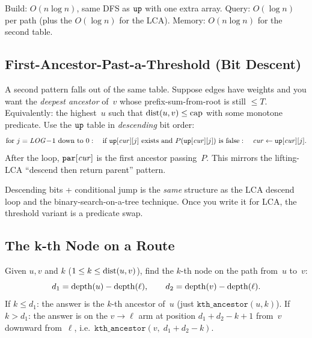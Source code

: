 \begin{complexitybox}
Build: \(O(n\log n)\), same DFS as \(\texttt{up}\) with one extra array.
Query: \(O(\log n)\) per path (plus the \(O(\log n)\) for the LCA).
Memory: \(O(n\log n)\) for the second table.
\end{complexitybox}

\subsection{First-Ancestor-Past-a-Threshold (Bit Descent)}

A second pattern falls out of the same table.  Suppose edges have
weights and you want the \emph{deepest ancestor} of~\(v\) whose
prefix-sum-from-root is still \(\le T\).  Equivalently: the highest~\(u\)
such that \(\operatorname{dist}(u, v) \le \text{cap}\) with some monotone predicate.
Use the \(\texttt{up}\) table in \emph{descending} bit order:
\[
\text{for } j = \mathit{LOG}\!-\!1 \text{ down to } 0:\quad
\text{if } \texttt{up}[\mathit{cur}][j] \text{ exists and } P(\texttt{up}[\mathit{cur}][j]) \text{ is false}:
\quad \mathit{cur} \leftarrow \texttt{up}[\mathit{cur}][j].
\]
After the loop, \(\texttt{par}[\mathit{cur}]\) is the first ancestor passing~\(P\).
This mirrors the lifting-LCA ``descend then return parent'' pattern.

\begin{insightbox}
Descending bits + conditional jump is the \emph{same} structure as
the LCA descend loop and the binary-search-on-a-tree technique.  Once you
write it for LCA, the threshold variant is a predicate swap.
\end{insightbox}

\subsection{The k-th Node on a Route}

Given \(u, v\) and \(k\) (\(1 \le k \le \operatorname{dist}(u,v)\)), find the
\(k\)-th node on the path from~\(u\) to~\(v\):
\[
  d_1 = \operatorname{depth}(u) - \operatorname{depth}(\ell), \qquad d_2 = \operatorname{depth}(v) - \operatorname{depth}(\ell).
\]
If \(k \le d_1\): the answer is the \(k\)-th ancestor of~\(u\)
(just \(\texttt{kth\_ancestor}(u,k)\)).
If \(k > d_1\): the answer is on the \(v\to\ell\) arm at position
\(d_1 + d_2 - k + 1\) from~\(v\) downward from~\(\ell\), i.e.\
\(\texttt{kth\_ancestor}(v,\; d_1+d_2-k)\).

